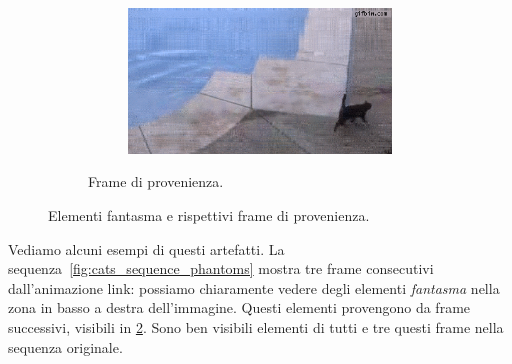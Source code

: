 \documentclass[11pt,a4paper]{article}
\begin{document}
\begin{figure}
\begin{subfigure}[b]{\wid\textwidth}
    \begin{subfigure}[b]{\wid\textwidth}
      \centering
      \includegraphics[keepaspectratio=true, scale=\scal]{Imgs/Cats/frame-113}
    \end{subfigure}
    \caption{Frame di provenienza.}\label{fig:cats_sequence_phantoms_comp}
  \end{subfigure}
  \caption{Elementi fantasma e rispettivi frame di provenienza.}
\end{figure}

Vediamo alcuni esempi di questi artefatti. La sequenza~\ref{fig:cats_sequence_phantoms} mostra tre frame consecutivi dall'animazione link: possiamo chiaramente vedere degli elementi \emph{fantasma} nella zona in basso a destra dell'immagine. Questi elementi provengono da frame successivi, visibili in \ref{fig:cats_sequence_phantoms_comp}. Sono ben visibili elementi di tutti e tre questi frame nella sequenza originale.

\end{document}
